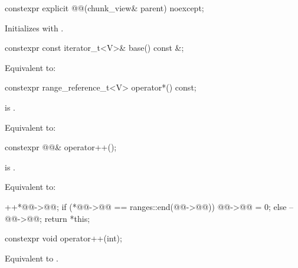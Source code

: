 \begin{itemdecl}
constexpr explicit @@(chunk_view& parent) noexcept;
\end{itemdecl}

\begin{itemdescr}
\pnum
\effects
Initializes  with .
\end{itemdescr}

\begin{itemdecl}
constexpr const iterator_t<V>& base() const &;
\end{itemdecl}

\begin{itemdescr}
\pnum
\effects
Equivalent to: 
\end{itemdescr}

\begin{itemdecl}
constexpr range_reference_t<V> operator*() const;
\end{itemdecl}

\begin{itemdescr}
\pnum
\expects
{} is .

\pnum
\effects
Equivalent to: 
\end{itemdescr}

\begin{itemdecl}
constexpr @@& operator++();
\end{itemdecl}

\begin{itemdescr}
\pnum
\expects
{} is .

\pnum
\effects
Equivalent to:
\begin{codeblock}
++*@@->@@;
if (*@@->@@ == ranges::end(@@->@@))
  @@->@@ = 0;
else
  --@@->@@;
return *this;
\end{codeblock}
\end{itemdescr}

\begin{itemdecl}
constexpr void operator++(int);
\end{itemdecl}

\begin{itemdescr}
\pnum
\effects
Equivalent to .
\end{itemdescr}

